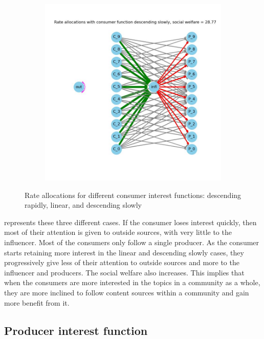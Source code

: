 \documentclass[11pt, letterpaper]{article}
\begin{document}
\begin{figure}[h]
\begin{adjustbox}{max width=1.5\textwidth,center}
\begin{subfigure}[b]{0.4\textwidth}
        \end{subfigure}
        \begin{subfigure}[b]{0.4\textwidth}
            \includegraphics[width=\linewidth]{"figures/f/descending slowly_allocs.jpg"}
        \end{subfigure}
    \end{adjustbox}
\caption{Rate allocations for different consumer interest functions: descending rapidly, linear, and descending slowly}
\label{fig:f}
\end{figure}

 represents these three different cases. If the consumer loses interest quickly, then most of their attention is given to outside sources, with very little to the influencer. Most of the consumers only follow a single producer. As the consumer starts retaining more interest in the linear and descending slowly cases, they progressively give less of their attention to outside sources and more to the influencer and producers. The social welfare also increases. This implies that when the consumers are more interested in the topics in a community as a whole, they are more inclined to follow content sources within a community and gain more benefit from it.

\subsection{Producer interest function}
\end{document}
